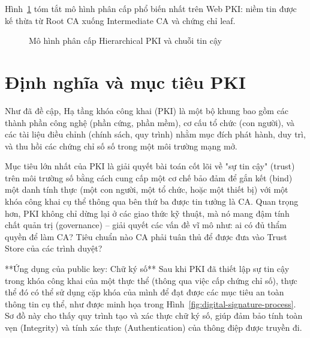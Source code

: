 Hình~\ref{fig:pki-hierarchy} tóm tắt mô hình phân cấp phổ biến nhất trên Web PKI: niềm tin được kế thừa từ Root CA xuống Intermediate CA và chứng chỉ leaf.

\begin{figure}[htbp]
    \centering
    \caption{Mô hình phân cấp Hierarchical PKI và chuỗi tin cậy}
    \label{fig:pki-hierarchy}
\end{figure}


\section{Định nghĩa và mục tiêu PKI}
\label{sec:3.2}
Như đã đề cập, Hạ tầng khóa công khai (PKI) là một bộ khung bao gồm các thành phần công nghệ (phần cứng, phần mềm), cơ cấu tổ chức (con người), và các tài liệu điều chỉnh (chính sách, quy trình) nhằm mục đích phát hành, duy trì, và thu hồi các chứng chỉ số số trong một môi trường mạng mở. 

Mục tiêu lớn nhất của PKI là giải quyết bài toán cốt lõi về "sự tin cậy" (trust) trên môi trường số bằng cách cung cấp một cơ chế bảo đảm để gắn kết (bind) một danh tính thực (một con người, một tổ chức, hoặc một thiết bị) với một khóa công khai cụ thể thông qua bên thứ ba được tin tưởng là CA. Quan trọng hơn, PKI không chỉ dừng lại ở các giao thức kỹ thuật, mà nó mang đậm tính chất quản trị (governance) – giải quyết các vấn đề vĩ mô như: ai có đủ thẩm quyền để làm CA? Tiêu chuẩn nào CA phải tuân thủ để được đưa vào Trust Store của các trình duyệt?

 **Ứng dụng của public key: Chữ ký số**
Sau khi PKI đã thiết lập sự tin cậy trong khóa công khai của một thực thể (thông qua việc cấp chứng chỉ số), thực thể đó có thể sử dụng cặp khóa của mình để đạt được các mục tiêu an toàn thông tin cụ thể, như được minh họa trong Hình~\ref{fig:digital-signature-process}. Sơ đồ này cho thấy quy trình tạo và xác thực chữ ký số, giúp đảm bảo tính toàn vẹn (Integrity) và tính xác thực (Authentication) của thông điệp được truyền đi.


